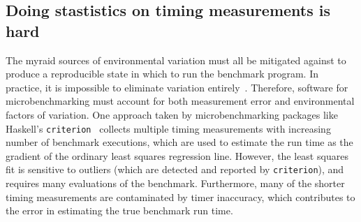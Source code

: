 \documentclass[conference]{IEEEtran}
\begin{document}

\label{sec:stats}
\subsection{Doing stastistics on timing measurements is hard}

The myraid sources of environmental variation must all be mitigated against to
produce a reproducible state in which to run the benchmark program. In practice,
it is impossible to eliminate variation entirely~\cite{Alcocer2015,Barrett2016}.
Therefore, software for microbenchmarking must account for both measurement error
and environmental factors of variation.
One approach taken by microbenchmarking packages like Haskell's
\lstinline|criterion|~\cite{criterion} collects multiple timing measurements
with increasing number of benchmark executions, which are used to estimate the
run time as the gradient of the ordinary least squares regression line.
However, the least squares fit is sensitive to outliers (which are detected and
reported by \lstinline|criterion|), and requires many evaluations of the benchmark.
Furthermore, many of the shorter timing measurements are contaminated by timer
inaccuracy, which contributes to the error in estimating the true benchmark run time.
\end{document}
